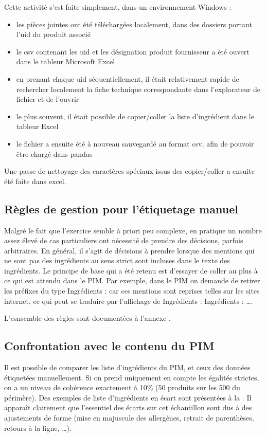             Cette activité s'est faite simplement, dans un environnement Windows : 
            \begin{itemize}
                \item les pièces jointes ont été téléchargées localement, dans des dossiers portant l'uid du produit associé
                \item le csv contenant les uid et les désignation produit fournisseur a été ouvert dans le tableur Microsoft Excel
                \item en prenant chaque uid séquentiellement, il était relativement rapide de rechercher localement la fiche technique correspondante dans l'explorateur de fichier et de l'ouvrir
                \item le plus souvent, il était possible de copier/coller la liste d'ingrédient dans le tableur Excel
                \item le fichier a ensuite été à nouveau sauvegardé au format csv, afin de pouvoir être chargé dans pandas
            \end{itemize}
            Une passe de nettoyage des caractères spéciaux issus des copier/coller a ensuite été faite dans excel.

            \subsection{Règles de gestion pour l'étiquetage manuel}
        
            Malgré le fait que l'exercice semble à priori peu complexe, en pratique un nombre assez élevé de cas particuliers ont nécessité de prendre des décisions, parfois arbitraires.
            En général, il s'agit de décisions à prendre lorsque des mentions qui ne sont pas des ingrédients au sens strict sont incluses dans le texte des ingrédients.
            Le principe de base qui a été retenu est d'essayer de coller au plus à ce qui est attendu dans le PIM. 
            Par exemple, dans le PIM on demande de retirer les préfixes du type \og Ingrédients : \fg car ces mentions sont reprises telles sur les sites internet, ce qui peut se traduire par l'affichage de \og Ingrédients : Ingrédients : \dots \fg.

            L'esnsemble des règles sont documentées à l'annexe .

            \subsection{Confrontation avec le contenu du PIM}
            \label{ingredient_comparison}
            Il est possible de comparer les liste d'ingrédients du PIM, et ceux des données étiquetées manuellement.
            Si on prend uniquement en compte les égalités strictes, on a un niveau de cohérence exactement à 10\% (50 produits sur les 500 du périmère).
            Des exemples de liste d'ingrédients en écart sont présentées à la .
            Il apparaît clairement que l'essentiel des écarts sur cet échantillon sont dus à des ajustements de forme (mise en majuscule des allergènes, retrait de parenthèses, retours à la ligne, \dots).

